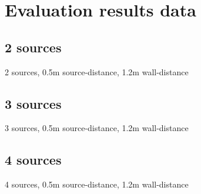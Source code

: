 \section{Evaluation results data}
\label{sec:appData}
\subsection*{2 sources}
\begin{table}[H]
	\centering
	
	\caption{2 sources, 0.5m source-distance, 1.2m wall-distance}
\end{table}

\subsection*{3 sources}
\begin{table}[H]
	\centering
	
	\caption{3 sources, 0.5m source-distance, 1.2m wall-distance}
\end{table}

\subsection*{4 sources}
\begin{table}[H]
	\centering
	
	\caption{4 sources, 0.5m source-distance, 1.2m wall-distance}
\end{table}

